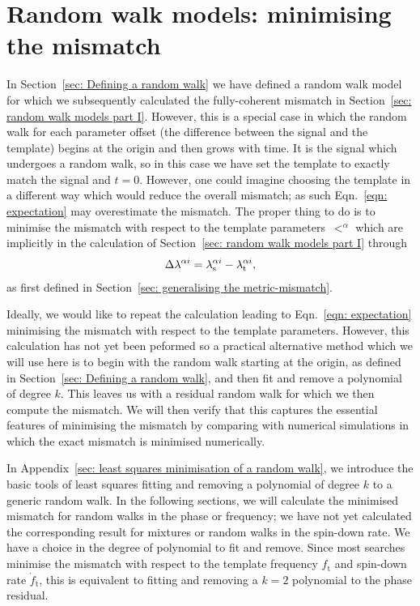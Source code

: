 \documentclass[../full_thesis/full_thesis.tex]{subfiles}
\begin{document}
\section{Random walk models: minimising the mismatch} 
\label{sec: random walk models part II}
In Section~\ref{sec: Defining a random walk} we have defined a random walk
model for which we subsequently calculated the fully-coherent mismatch in
Section~\ref{sec: random walk models part I}. However, this is a special case
in which the random walk for each parameter offset (the difference between the
signal and the template) begins at the origin and then grows with time. It is
the signal which undergoes a random walk, so in this case we have set the
template to exactly match the signal and $t=0$. However, one could imagine choosing
the template in a different way which would reduce the overall mismatch; as such
Eqn.~\eqref{eqn: expectation} may overestimate the mismatch. The proper thing to
do is to minimise the mismatch with respect to the
template parameters~$\lt^{\alpha}$ which are implicitly in the calculation of
Section~\ref{sec: random walk models part I} through
\begin{align}
\Delta \lambda^{\alpha i} = {\lambda}_\textrm{s}^{\alpha i} - {\lambda}_\textrm{t}^{\alpha i},
\end{align}
as first defined in Section~\ref{sec: generalising the metric-mismatch}.

Ideally, we would like to repeat the calculation leading to Eqn.~\eqref{eqn:
expectation} minimising the mismatch with respect to the template parameters.
However, this calculation has not yet been peformed so a practical alternative
method which we will use here is to begin with the random walk starting at the
origin, as defined in Section~\ref{sec: Defining a random walk}, and then fit and
remove a polynomial of degree $k$. This leaves us with a residual random walk for
which we then compute the mismatch. We will then verify that this captures the
essential features of minimising the mismatch by comparing with numerical
simulations in which the exact mismatch is minimised numerically.

In Appendix~\ref{sec: least squares minimisation of a random walk}, we
introduce the basic tools of least squares fitting and removing a polynomial of
degree $k$ to a generic random walk. In the following sections, we will
calculate the minimised mismatch for random walks in the phase or frequency; we
have not yet calculated the corresponding result for mixtures or random walks
in the spin-down rate. We have a choice in the degree of polynomial to fit and
remove. Since most searches minimise the mismatch with respect to the template
frequency $f_\textrm{t}$ and spin-down rate $\dot{f}_{\textrm{t}}$, this is
equivalent to fitting and removing a $k=2$ polynomial to the phase residual.
\end{document}
